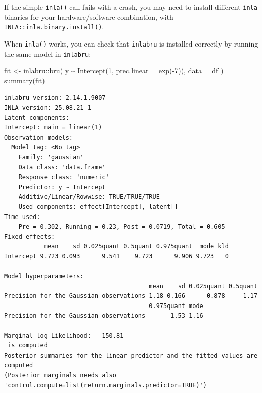 \documentclass[
  letterpaper,
  DIV=11,
  numbers=noendperiod]{scrartcl}
\newenvironment{Shaded}{\begin{snugshade}}{\end{snugshade}}
\newcommand{\AttributeTok}[1]{\textcolor[rgb]{0.40,0.45,0.13}{#1}}
\newcommand{\DecValTok}[1]{\textcolor[rgb]{0.68,0.00,0.00}{#1}}
\newcommand{\FunctionTok}[1]{\textcolor[rgb]{0.28,0.35,0.67}{#1}}
\newcommand{\NormalTok}[1]{\textcolor[rgb]{0.00,0.23,0.31}{#1}}
\newcommand{\OtherTok}[1]{\textcolor[rgb]{0.00,0.23,0.31}{#1}}
\newcommand{\SpecialCharTok}[1]{\textcolor[rgb]{0.37,0.37,0.37}{#1}}
\begin{document}
If the simple \texttt{inla()} call fails with a crash, you may need to
install different \texttt{inla} binaries for your hardware/software
combination, with \texttt{INLA::inla.binary.install()}.

When \texttt{inla()} works, you can check that \texttt{inlabru} is
installed correctly by running the same model in \texttt{inlabru}:

\begin{Shaded}
\begin{Highlighting}[]
\NormalTok{fit }\OtherTok{\textless{}{-}}\NormalTok{ inlabru}\SpecialCharTok{::}\FunctionTok{bru}\NormalTok{(}
\NormalTok{  y }\SpecialCharTok{\textasciitilde{}} \FunctionTok{Intercept}\NormalTok{(}\DecValTok{1}\NormalTok{, }\AttributeTok{prec.linear =} \FunctionTok{exp}\NormalTok{(}\SpecialCharTok{{-}}\DecValTok{7}\NormalTok{)),}
  \AttributeTok{data =}\NormalTok{ df}
\NormalTok{)}
\FunctionTok{summary}\NormalTok{(fit)}
\end{Highlighting}
\end{Shaded}

\begin{verbatim}
inlabru version: 2.14.1.9007 
INLA version: 25.08.21-1 
Latent components:
Intercept: main = linear(1)
Observation models:
  Model tag: <No tag>
    Family: 'gaussian'
    Data class: 'data.frame'
    Response class: 'numeric'
    Predictor: y ~ Intercept
    Additive/Linear/Rowwise: TRUE/TRUE/TRUE
    Used components: effect[Intercept], latent[] 
Time used:
    Pre = 0.302, Running = 0.23, Post = 0.0719, Total = 0.605 
Fixed effects:
           mean    sd 0.025quant 0.5quant 0.975quant  mode kld
Intercept 9.723 0.093      9.541    9.723      9.906 9.723   0

Model hyperparameters:
                                        mean    sd 0.025quant 0.5quant
Precision for the Gaussian observations 1.18 0.166      0.878     1.17
                                        0.975quant mode
Precision for the Gaussian observations       1.53 1.16

Marginal log-Likelihood:  -150.81 
 is computed 
Posterior summaries for the linear predictor and the fitted values are computed
(Posterior marginals needs also 'control.compute=list(return.marginals.predictor=TRUE)')
\end{verbatim}
\end{document}
